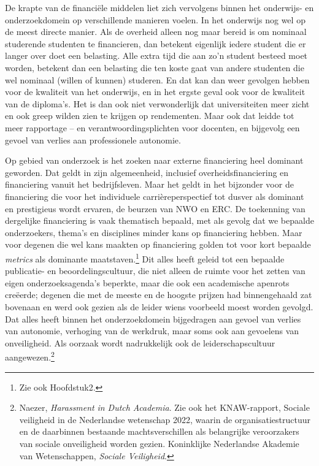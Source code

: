 \documentclass[smallauthor, chapterhaspagenum, nochapterinheader, pagenuminheader,  bigchapnum,medium2, tocpages,  garamond, titleinheader]{jote-book}
\begin{document}
	De krapte van de financiële middelen liet zich vervolgens binnen het onderwijs- en onderzoekdomein op verschillende manieren voelen. In het onderwijs nog wel op de meest directe manier. Als de overheid alleen nog maar bereid is om nominaal studerende studenten te financieren, dan betekent eigenlijk iedere student die er langer over doet een belasting. Alle extra tijd die aan zo'n student besteed moet worden, betekent dan een belasting die ten koste gaat van andere studenten die wel nominaal (willen of kunnen) studeren. En dat kan dan weer gevolgen hebben voor de kwaliteit van het onderwijs, en in het ergste geval ook voor de kwaliteit van de diploma's. Het is dan ook niet verwonderlijk dat universiteiten meer zicht en ook greep wilden zien te krijgen op rendementen. Maar ook dat leidde tot meer rapportage -- en verantwoordingsplichten voor docenten, en bijgevolg een gevoel van verlies aan professionele autonomie.



	Op gebied van onderzoek is het zoeken naar externe financiering heel dominant geworden. Dat geldt in zijn algemeenheid, inclusief overheidsfinanciering en financiering vanuit het bedrijfsleven. Maar het geldt in het bijzonder voor de financiering die voor het individuele carrièreperspectief tot dusver als dominant en prestigieus wordt ervaren, de beurzen van NWO en ERC. De toekenning van dergelijke financiering is vaak thematisch bepaald, met als gevolg dat we bepaalde onderzoekers, thema's en disciplines minder kans op financiering hebben. Maar voor degenen die wel kans maakten op financiering golden tot voor kort bepaalde \emph{metrics} als dominante maatstaven.\footnote{Zie ook Hoofdstuk2. } Dit alles heeft geleid tot een bepaalde publicatie- en beoordelingscultuur, die niet alleen de ruimte voor het zetten van eigen onderzoeksagenda's beperkte, maar die ook een academische apenrots creëerde; degenen die met de meeste en de hoogste prijzen had binnengehaald zat bovenaan en werd ook gezien als de leider wiens voorbeeld moest worden gevolgd. Dat alles heeft binnen het onderzoekdomein bijgedragen aan gevoel van verlies van autonomie, verhoging van de werkdruk, maar soms ook aan gevoelens van onveiligheid. Als oorzaak wordt nadrukkelijk ook de leiderschapscultuur aangewezen.\footnote{Naezer, \emph{Harassment}\emph{ in Dutch }\emph{Academia}. Zie ook het KNAW-rapport, Sociale veiligheid in de Nederlandse wetenschap 2022, waarin de organisatiestructuur en de daarbinnen bestaande machtsverschillen als belangrijke veroorzakers van sociale onveiligheid worden gezien. Koninklijke Nederlandse Akademie van Wetenschappen, \emph{Sociale Veiligheid}.}
\end{document}
